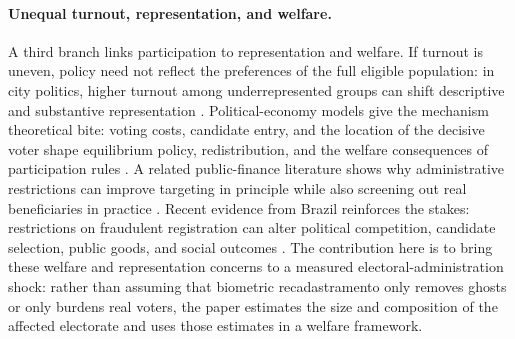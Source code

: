 \paragraph{Unequal turnout, representation, and welfare.}
A third branch links participation to representation and welfare. If turnout is uneven, policy need not reflect the preferences of the full eligible population: in city politics, higher turnout among underrepresented groups can shift descriptive and substantive representation \cite{Hajnal2005WhereTurnoutMatters}. Political-economy models give the mechanism theoretical bite: voting costs, candidate entry, and the location of the decisive voter shape equilibrium policy, redistribution, and the welfare consequences of participation rules \cite{besleyCoate1997,Meltzer1981RationalTheoryThe,Borgers2004CostlyVoting,Krasa2008MandatorVotingBetter}. A related public-finance literature shows why administrative restrictions can improve targeting in principle while also screening out real beneficiaries in practice \cite{Nichols1982TargetinTransferThrough,Deshpande2019WhoScreenedOut}. Recent evidence from Brazil reinforces the stakes: restrictions on fraudulent registration can alter political competition, candidate selection, public goods, and social outcomes \cite{Karim2025VoterBuyingPolitici}. The contribution here is to bring these welfare and representation concerns to a measured electoral-administration shock: rather than assuming that biometric recadastramento only removes ghosts or only burdens real voters, the paper estimates the size and composition of the affected electorate and uses those estimates in a welfare framework.

